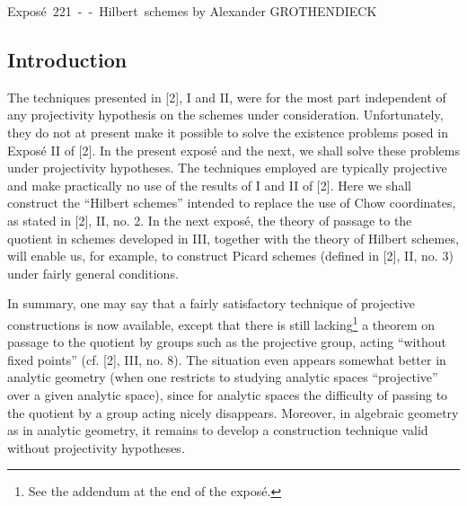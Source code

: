 \unit{Exposé 221 -- Hilbert schemes}
%
  {by Alexander GROTHENDIECK}

\subsection*{Introduction}

The techniques presented in [2], I and II, were for the most part independent
of any projectivity hypothesis on the schemes under consideration.
Unfortunately, they do not at present make it possible to solve the existence
problems posed in Exposé II of [2]. In the present exposé and the next, we shall
solve these problems under projectivity hypotheses. The techniques employed
are typically projective and make practically no use of the results of I and
II of [2]. Here we shall construct the “Hilbert schemes” intended to replace
the use of Chow coordinates, as stated in [2], II, no. 2. In the next exposé,
the theory of passage to the quotient in schemes developed in III, together
with the theory of Hilbert schemes, will enable us, for example, to construct
Picard schemes (defined in [2], II, no. 3) under fairly general conditions.

In summary, one may say that a fairly satisfactory technique of projective
constructions is now available, except that there is still
lacking\footnote{See the addendum at the end of the exposé.} a theorem on
passage to the quotient by groups such as the projective group, acting
“without fixed points” (cf. [2], III, no. 8). The situation even appears
somewhat better in analytic geometry (when one restricts to studying analytic
spaces “projective” over a given analytic space), since for analytic spaces
the difficulty of passing to the quotient by a group acting nicely disappears.
Moreover, in algebraic geometry as in analytic geometry, it remains to develop
a construction technique valid without projectivity hypotheses.


